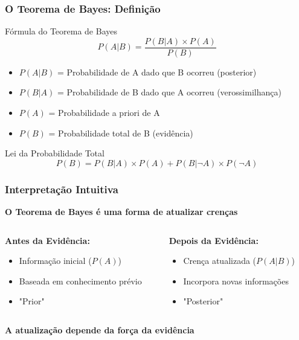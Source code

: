 \documentclass[11pt]{beamer}
\begin{document}
\begin{frame}
\frametitle{O Teorema de Bayes: Definição}
\begin{block}{Fórmula do Teorema de Bayes}
\begin{equation*}
P(A|B) = \frac{P(B|A) \times P(A)}{P(B)}
\end{equation*}
\end{block}

\begin{itemize}
\item $P(A|B)$ = Probabilidade de A dado que B ocorreu (posterior)
\item $P(B|A)$ = Probabilidade de B dado que A ocorreu (verossimilhança)
\item $P(A)$ = Probabilidade a priori de A
\item $P(B)$ = Probabilidade total de B (evidência)
\end{itemize}

\begin{block}{Lei da Probabilidade Total}
\begin{equation*}
P(B) = P(B|A) \times P(A) + P(B|\neg A) \times P(\neg A)
\end{equation*}
\end{block}
\end{frame}

\begin{frame}
\frametitle{Interpretação Intuitiva}
\begin{center}
\textbf{O Teorema de Bayes é uma forma de atualizar crenças}
\end{center}

\begin{columns}
\begin{column}{0.48\textwidth}
\textbf{Antes da Evidência:}
\begin{itemize}
\item Informação inicial ($P(A)$)
\item Baseada em conhecimento prévio
\item "Prior"
\end{itemize}
\end{column}

\begin{column}{0.48\textwidth}
\textbf{Depois da Evidência:}
\begin{itemize}
\item Crença atualizada ($P(A|B)$)
\item Incorpora novas informações
\item "Posterior"
\end{itemize}
\end{column}
\end{columns}

\vspace{0.5cm}
\begin{center}
\textbf{A atualização depende da força da evidência}
\end{center}
\end{frame}
\end{document}
